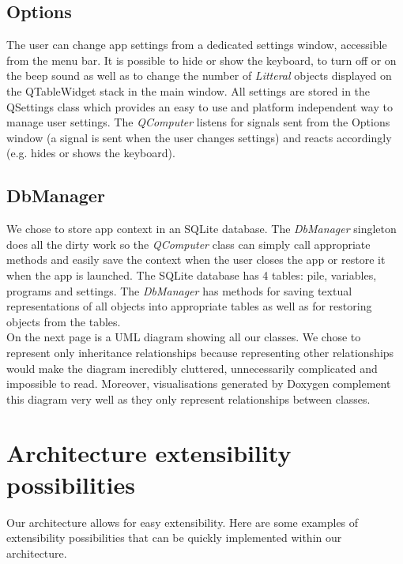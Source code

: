 \documentclass[titlepage]{article}
\begin{document}
    \subsection{Options}
    
    The user can change app settings from a dedicated settings window, accessible from the menu bar. It is possible to hide or show the keyboard, to turn off or on the beep sound as well as to change the number of \textit{Litteral} objects displayed on the QTableWidget stack in the main window. All settings are stored in the QSettings class which provides an easy to use and platform independent way to manage user settings. The \textit{QComputer} listens for signals sent from the Options window (a signal is sent when the user changes settings) and reacts accordingly (e.g. hides or shows the keyboard).
    
    \subsection{DbManager}
    
    We chose to store app context in an SQLite database. The \textit{DbManager} singleton does all the dirty work so the \textit{QComputer} class can simply call appropriate methods and easily save the context when the user closes the app or restore it when the app is launched. The SQLite database has 4 tables: pile, variables, programs and settings. The \textit{DbManager} has methods for saving textual representations of all objects into appropriate tables as well as for restoring objects from the tables.\\
    
    On the next page is a UML diagram showing all our classes. We chose to represent only inheritance relationships because representing other relationships would make the diagram incredibly cluttered, unnecessarily complicated and impossible to read. Moreover, visualisations generated by Doxygen complement this diagram very well as they only represent relationships between classes.

\newpage
\section{Architecture extensibility possibilities}
	Our architecture allows for easy extensibility. Here are some examples of extensibility possibilities that can be quickly implemented within our architecture.
\end{document}
